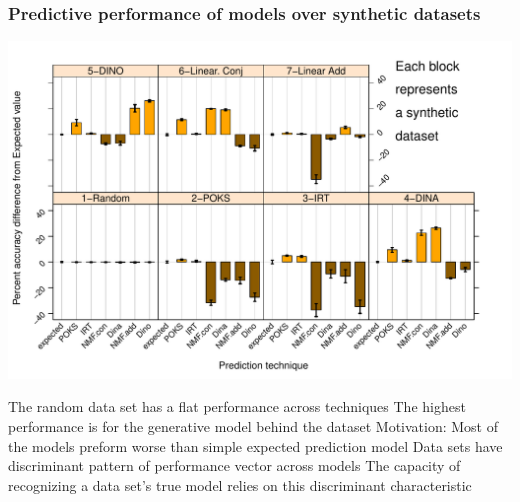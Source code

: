 \documentclass{beamer}
\begin{document}
\begin{frame}\frametitle{Predictive performance of models over synthetic datasets}
\vspace{-0.5cm}
\includegraphics[scale =0.45] {images/Syn}
\begin{overprint}
      The random data set has a flat performance across techniques 
       \small The highest performance is for the generative model behind the dataset
	  \onslide<3> Motivation: Most of the models preform worse than simple expected prediction model %
	  \onslide<4> \small Data sets have discriminant pattern of performance vector across models
	  \onslide<5> The capacity of recognizing a data set’s true model relies on this discriminant characteristic
\end{overprint}
\end{frame}
\end{document}
